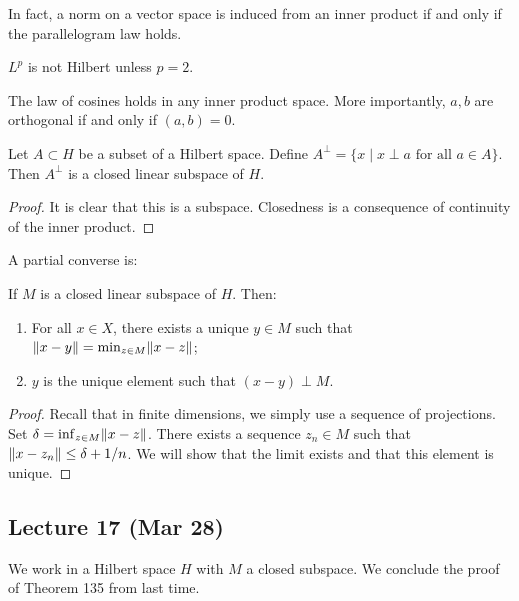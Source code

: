 \documentclass[10pt, twoside]{article}
\begin{document}
    \begin{rmk}
        In fact, a norm on a vector space is induced from an inner product if and only if the parallelogram law holds.
    \end{rmk}

    \begin{cor}
        $L^p$ is not Hilbert unless $p=2$.
    \end{cor}

    The law of cosines holds in any inner product space. More importantly, $a,b$ are orthogonal if and only if $(a,b) = 0$.

    \begin{thm}
        Let $A \subset H$ be a subset of a Hilbert space. Define $A^{\perp} = \{x \mid x \perp a \text{ for all }a \in A\}$. Then $A^{\perp}$ is a closed linear subspace of $H$.
        \begin{proof}
            It is clear that this is a subspace. Closedness is a consequence of continuity of the inner product.
        \end{proof}
    \end{thm}

    A partial converse is:
    \begin{thm}
        If $M$ is a closed linear subspace of $H$. Then:
        \begin{enumerate}
            \item For all $x \in X$, there exists a unique $y \in M$ such that $\lVert x-y\rVert = \min_{z \in M} \lVert x-z\rVert$;
            \item $y$ is the unique element such that $(x-y) \perp M$.
        \end{enumerate}
        \begin{proof}
            Recall that in finite dimensions, we simply use a sequence of projections. Set $\delta = \inf_{z \in M} \lVert x-z\rVert$. There exists a sequence $z_n \in M$ such that $\lVert x-z_n\rVert \leq \delta + 1/n$. We will show that the limit exists and that this element is unique.
        \end{proof}
    \end{thm}

    \subsection{Lecture 17 (Mar 28)}

    We work in a Hilbert space $H$ with $M$ a closed subspace. We conclude the proof of Theorem 135 from last time. 
\end{document}
